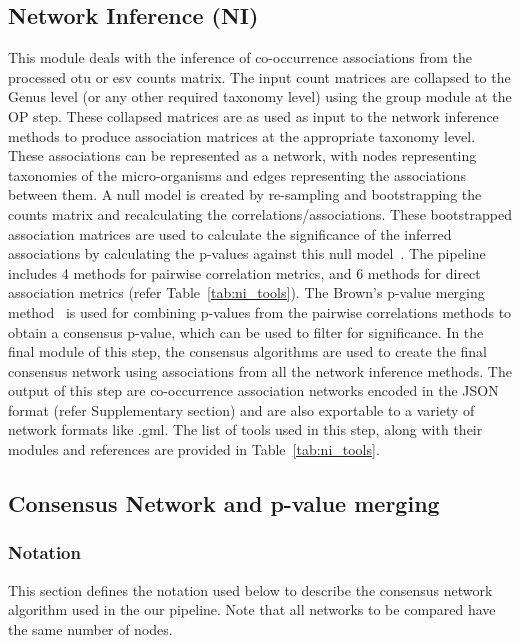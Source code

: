   \subsection*{Network Inference (NI)}
  \vspace{-5mm}
  This module deals with the inference of co-occurrence associations from the processed \ac{otu} or \ac{esv} counts matrix.
  The input count matrices are collapsed to the Genus level (or any other required taxonomy level) using the group module at the OP step.
  These collapsed matrices are as used as input to the network inference methods to produce association matrices at the appropriate taxonomy level.
  These associations can be represented as a network, with nodes representing taxonomies of the micro-organisms and edges representing the associations between them.
  A null model is created by re-sampling and bootstrapping the counts matrix and recalculating the correlations/associations.
  These bootstrapped association matrices are used to calculate the significance of the inferred associations by calculating the p-values against this null model~\cite{Watts2018}.
  The pipeline includes 4 methods for pairwise correlation metrics, and 6 methods for direct association metrics (refer Table~\ref{tab:ni_tools}).
  The Brown's p-value merging method~\cite{brown_400_1975} is used for combining p-values from the pairwise correlations methods to obtain a consensus p-value, which can be used to filter for significance.
  In the final module of this step, the consensus algorithms are used to create the final consensus network using associations from all the network inference methods.
  The output of this step are co-occurrence association networks encoded in the JSON format (refer Supplementary section) and are also exportable to a variety of network formats like .gml.
  The list of tools used in this step, along with their modules and references are provided in Table~\ref{tab:ni_tools}.

  \subsection*{Consensus Network and p-value merging}
  \vspace{-5mm}

 \subsubsection*{Notation}

  This section defines the notation used below to describe the consensus network algorithm used in the our pipeline. Note that all networks to be compared have the same number of nodes.

